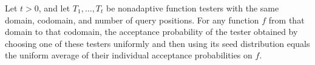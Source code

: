 \begin{theorem}
\label{FABL.uniformMixtureFunctionTester_acceptanceProbability}
\leanok
{}
Let $t>0$, and let $T_1,\ldots,T_t$ be nonadaptive function testers with the same
domain, codomain, and number of query positions. For any function $f$ from that domain
to that codomain, the acceptance probability of the tester obtained by choosing one of
these testers uniformly and then using its seed distribution equals the uniform average
of their individual acceptance probabilities on $f$.
\end{theorem}

